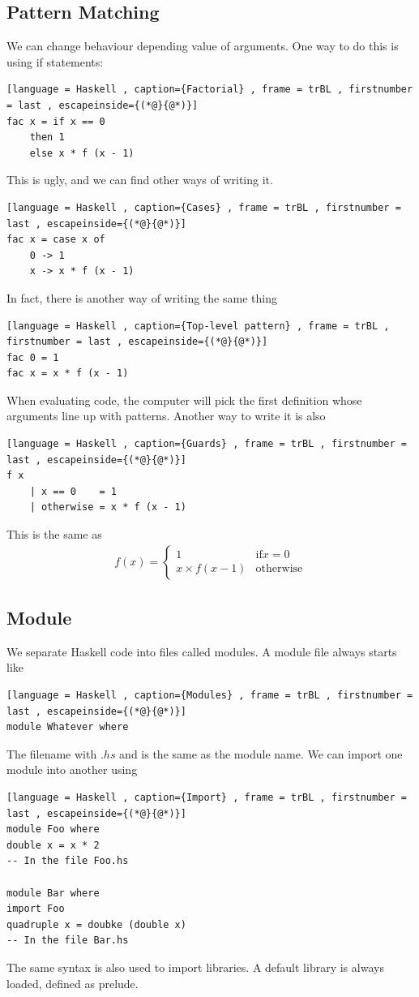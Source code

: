 \documentclass[a4paper]{article}
\theoremstyle{plain}
\theoremstyle{definition}
\theoremstyle{remark}
\begin{document}
\subsection{Pattern Matching}
We can change behaviour depending value of arguments. One way to do this is using if statements:
\begin{lstlisting}[language = Haskell , caption={Factorial} , frame = trBL , firstnumber = last , escapeinside={(*@}{@*)}]
fac x = if x == 0
	then 1
	else x * f (x - 1)
\end{lstlisting}
This is ugly, and we can find other ways of writing it.
\begin{lstlisting}[language = Haskell , caption={Cases} , frame = trBL , firstnumber = last , escapeinside={(*@}{@*)}]
fac x = case x of
	0 -> 1
	x -> x * f (x - 1)
\end{lstlisting}
In fact, there is another way of writing the same thing
\begin{lstlisting}[language = Haskell , caption={Top-level pattern} , frame = trBL , firstnumber = last , escapeinside={(*@}{@*)}]
fac 0 = 1
fac x = x * f (x - 1)
\end{lstlisting}
When evaluating code, the computer will pick the first definition whose arguments line up with patterns. Another way to write it is also
\begin{lstlisting}[language = Haskell , caption={Guards} , frame = trBL , firstnumber = last , escapeinside={(*@}{@*)}]
f x
	| x == 0	= 1
	| otherwise	= x * f (x - 1)
\end{lstlisting}
This is the same as
\begin{align*}f(x)=
	\begin{cases}
		1 & \text{if} x = 0\\
		x \times f(x-1) & \text{otherwise}
	\end{cases}
\end{align*}
\subsection{Module}
We separate Haskell code into files called modules. A module file always starts like
\begin{lstlisting}[language = Haskell , caption={Modules} , frame = trBL , firstnumber = last , escapeinside={(*@}{@*)}]
module Whatever where
\end{lstlisting}
The filename with $.hs$ and is the same as the module name. We can import one module into another using
\begin{lstlisting}[language = Haskell , caption={Import} , frame = trBL , firstnumber = last , escapeinside={(*@}{@*)}]
module Foo where
double x = x * 2
-- In the file Foo.hs

module Bar where
import Foo
quadruple x = doubke (double x)
-- In the file Bar.hs
\end{lstlisting}
The same syntax is also used to import libraries. A default library is always loaded, defined as prelude.
\end{document}

